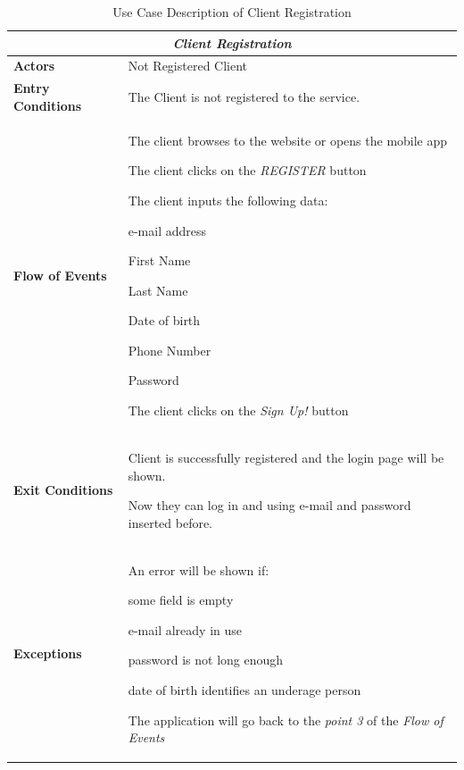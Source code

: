 \documentclass[a4paper]{article}
\begin{document}
\renewcommand{\arraystretch}{1.25}

\begin{table} [H]
\begin{center}
\begin{tabular}{ |m{}|m{}|  }
\hline
    \multicolumn{2}{|c|}{\textbf{\textit{Client Registration}}} \\
\hline \hline
    \textbf{Actors}
&   Not Registered Client
\\ \hline
    \textbf{Entry Conditions}
&   The Client is not registered to the service.
\\ \hline
    \textbf{Flow of Events}
& 
    \begin{enumerate*}
    \item The client browses to the website or opens the mobile app
    \item The client clicks on the \emph{REGISTER} button
    \item The client inputs the following data:
        \begin{enumerate*}
        \item e-mail address
        \item First Name
        \item Last Name
        \item Date of birth
        \item Phone Number
        \item Password
        \end{enumerate*}
    \item The client clicks on the \emph{Sign Up!} button
    \end{enumerate*}
\\ \hline
    \textbf{Exit Conditions}
&   Client is successfully registered and the login page will be shown. 

    Now they can log in and using e-mail and password inserted before.
\\ \hline
    \textbf{Exceptions}
&   
    An error will be shown if:
    \begin{itemize*}
    \item some field is empty
    \item e-mail already in use
    \item password is not long enough
    \item date of birth identifies an underage person
    \end{itemize*}
    The application will go back to the \emph{point 3} of the \emph{Flow of Events}
\\ \hline
\end{tabular}
\end{center}
\caption{Use Case Description of Client Registration}
\label{table:clientregistration}
\end{table}
\end{document}
